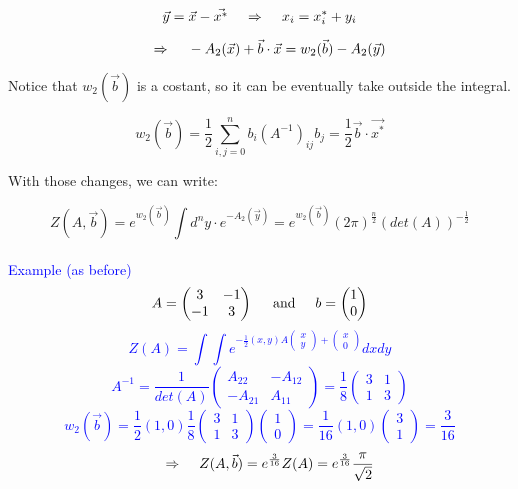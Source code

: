 \documentclass[12pt, english, a4paper]{book}
\newcommand{\Rarr}{\hspace{0.5cm} \mathbb{\Rightarrow} \hspace{0.5cm}}
\begin{document}
$$ \vec{y} = \vec{x} - \vec{x^*} \Rarr x_i = x^*_i + y_i $$

$$ \Rarr -A_2 (\vec{x}) + \vec{b} \cdot \vec{x} = w_2(\vec{b}) - A_2 (\vec{y}) $$

Notice that $ w_2(\vec{b})$ is a costant, so it can be eventually take outside the integral.

$$ w_2(\vec{b}) = \frac{1}{2} \sum\limits_{i,j=0}^{n} b_i (A^{-1})_{ij} b_j = \frac{1}{2} \vec{b} \cdot \vec{x^*} $$

With those changes, we can write:

\begin{equation}\label{Gaussian Integral x_to_y}
Z(A, \vec{b}) = e^{w_2(\vec{b})} \int d^{n}y \cdot e^{ -A_2(\vec{y})} = e^{w_2(\vec{b})} (2\pi)^{\frac{n}{2}} (det(A))^{-\frac{1}{2}}
\end{equation} \\

\textcolor{blue}
{ Example (as before) $$ A = \left(
\begin{matrix}
3 & -1 \\
-1 & 3
\end{matrix}
\right) \hspace{0.5cm} \mathrm{and} \hspace{0.5cm} b = \left(
\begin{matrix}
1 \\
0
\end{matrix} \right)
$$
$$ Z(A) = \int \int e^{- \frac{1}{2} (x,y) A \left( \begin{smallmatrix}
x \\
y
\end{smallmatrix} \right) +  \left( \begin{smallmatrix}
x \\
0
\end{smallmatrix} \right)} dxdy $$
$$ A^{-1} = \frac{1}{det(A)} \left(
\begin{matrix}
A_{22} & -A_{12} \\
-A_{21} & A_{11}
\end{matrix}
\right) = \frac{1}{8} \left(
\begin{matrix}
3 & 1 \\
1 & 3
\end{matrix}
\right) $$
$$ w_2(\vec{b}) = \frac{1}{2} (1, 0) \frac{1}{8} \left(
\begin{matrix}
3 & 1 \\
1 & 3
\end{matrix}
\right) \left(
\begin{matrix}
1 \\
0
\end{matrix}
\right) = \frac{1}{16} (1, 0) \left(
\begin{matrix}
3 \\
1
\end{matrix}
\right) = \frac{3}{16}
$$
$$ \Rarr Z(A, \vec{b}) = e^{\frac{3}{16}} Z(A) = e^{\frac{3}{16}} \frac{\pi}{\sqrt{2}} $$} \\
\end{document}
